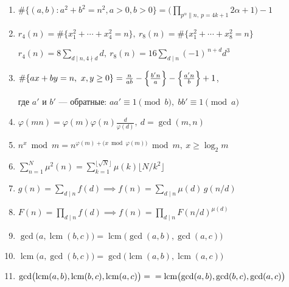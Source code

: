 \documentclass[9pt,a4paper,landscape,twosided]{extarticle}
\begin{document}
\begin{multicols*}{3}
\begin{enumerate}
\item %
$\displaystyle \#\{(a,b):a^2+b^2=n^2,a>0,b>0\}
=\Big(\prod_{p^\alpha\parallel n,\ p = 4k+1}2\alpha+1\Big)-1$

\item %
$r_4(n)=\#\{x_1^2+\cdots+x_4^2=n\},\ 
r_8(n)=\#\{x_1^2+\cdots+x_8^2=n\}$

$r_4(n)=8\sum_{d\mid n, 4\nmid d}d,\ 
r_8(n)=16\sum_{d\mid n}(-1)^{\,n+d}d^3$

\item %
$\#\{ax+by=n,\ x,y\ge0\}=\frac{n}{ab}-\Bigl\{\tfrac{b'n}{a}\Bigr\}-\Bigl\{\tfrac{a'n}{b}\Bigr\}+1$,

где $a'$ и $b'$ — обратные: $aa'\equiv1\pmod b,\; bb'\equiv1\pmod a$

\item %
$\varphi(mn)=\varphi(m)\varphi(n)\frac{d}{\varphi(d)},\  d=\gcd(m,n)$

\item %
$n^x\bmod m = n^{\varphi(m)+\bigl(x\bmod\varphi(m)\bigr)}\bmod m,\ x\ge\log_2 m$

\item %
$\sum_{n=1}^N\mu^2(n)=\sum_{k=1}^{\lfloor\sqrt N\rfloor}\mu(k)\bigl\lfloor N/k^2\bigr\rfloor$

\item %
$g(n)=\sum_{d\mid n}f(d) \implies f(n)=\sum_{d\mid n}\mu(d)\,g(n/d)$

\item %
$F(n)=\prod_{d\mid n}f(d) \implies f(n)=\prod_{d\mid n}F(n/d)^{\mu(d)}$

\item %
$\gcd\bigl(a,\operatorname{lcm}(b,c)\bigr)=\operatorname{lcm}\bigl(\gcd(a,b),\gcd(a,c)\bigr)$

\item %
$\operatorname{lcm}\bigl(a,\gcd(b,c)\bigr)=\gcd\bigl(\operatorname{lcm}(a,b),\operatorname{lcm}(a,c)\bigr)$

\item %
$\gcd\bigl(\operatorname{lcm}(a,b),\operatorname{lcm}(b,c),\operatorname{lcm}(a,c)\bigr)
 =\\= \operatorname{lcm}\bigl(\gcd(a,b),\gcd(b,c),\gcd(a,c)\bigr)$


\end{enumerate}
\end{multicols*}
\end{document}
